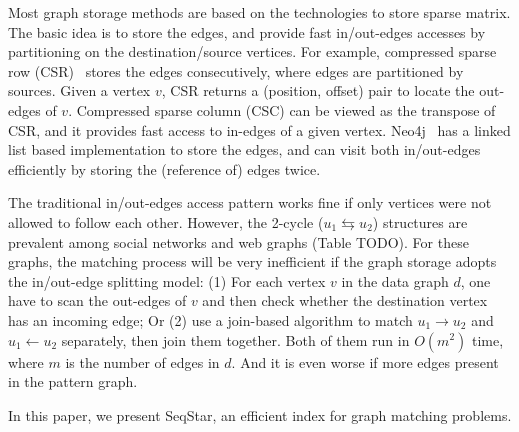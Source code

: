 Most graph storage methods are based on the technologies to store sparse matrix.
The basic idea is to store the edges, and provide fast in/out-edges accesses by partitioning on the destination/source vertices.
For example, compressed sparse row (CSR)~\cite{1447941} stores the edges consecutively, where edges are partitioned by sources.
Given a vertex $v$, CSR returns a (position, offset) pair to locate the out-edges of $v$.
Compressed sparse column (CSC) can be viewed as the transpose of CSR, and it provides fast access to in-edges of a given vertex.
Neo4j~\cite{Neo4j} has a linked list based implementation to store the edges, and can visit both in/out-edges efficiently by storing the (reference of) edges twice.

The traditional in/out-edges access pattern works fine if only vertices were not allowed to follow each other.
However, the 2-cycle ($u_1 \leftrightarrows u_2$) structures are prevalent among social networks and web graphs (Table TODO).
For these graphs, the matching process will be very inefficient if the graph storage adopts the in/out-edge splitting model:
(1) For each vertex $v$ in the data graph $d$, one have to scan the out-edges of $v$ and then check whether the destination vertex has an incoming edge;
Or (2) use a join-based algorithm to match $u_1 \rightarrow u_2$ and $u_1 \leftarrow u_2$ separately, then join them together.
Both of them run in $O(m^2)$ time, where $m$ is the number of edges in $d$.
And it is even worse if more edges present in the pattern graph.

In this paper, we present SeqStar, an efficient index for graph matching problems.
